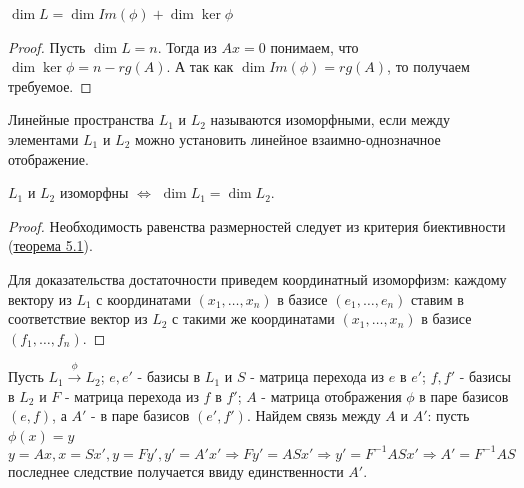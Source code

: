 \begin{theorem}
    $\dim L=\dim Im(\phi) +\dim \ker \phi$
\end{theorem}
\begin{proof}
    Пусть $\dim L=n$. Тогда из $Ax=0$ понимаем, что $\dim \ker \phi = n-rg(A)$. А так как $\dim Im(\phi)=rg(A)$, то получаем требуемое.
\end{proof}
\begin{definition}
    Линейные пространства $L_1$ и $L_2$ называются изоморфными, если между элементами $L_1$ и $L_2$ можно установить линейное взаимно-однозначное отображение. 
\end{definition}
\begin{proposition}
    $L_1$ и $L_2$ изоморфны $\Leftrightarrow$ $\dim L_1=\dim L_2$.
\end{proposition}
\begin{proof}
    Необходимость равенства размерностей следует из критерия биективности (\hyperref[theor]{теорема 5.1}). 
    
    Для доказательства достаточности приведем координатный изоморфизм: каждому вектору из $L_1$ с координатами $(x_1, \dots, x_n)$ в базисе $(e_1, \dots, e_n)$ ставим в соответствие вектор из $L_2$ с такими же координатами $(x_1, \dots, x_n)$ в базисе $(f_1, \dots, f_n)$.
\end{proof}
Пусть $L_1\overset{\phi} \to L_2$; $e, e'$ - базисы в $L_1$ и $S$ - матрица перехода из $e$ в $e'$; $f, f'$ - базисы в $L_2$ и $F$ - матрица перехода из $f$ в $f'$; $A$ - матрица отображения $\phi$ в паре базисов $(e, f)$, а $A'$ - в паре базисов $(e', f')$. Найдем связь между $A$ и $A'$: пусть $\phi(x)=y$
\[
    y=Ax, x=Sx', y=Fy', y'=A'x' \Rightarrow Fy'=ASx' \Rightarrow y'=F^{-1}ASx'\Rightarrow A'=F^{-1}AS
\]
последнее следствие получается ввиду единственности $A'$.

